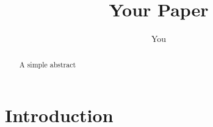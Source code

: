 \documentclass{article}
\title{Your Paper}
\author{You}
\begin{document}
\maketitle
\begin{abstract}
A simple abstract
\end{abstract}

\section{Introduction}



\end{document}
